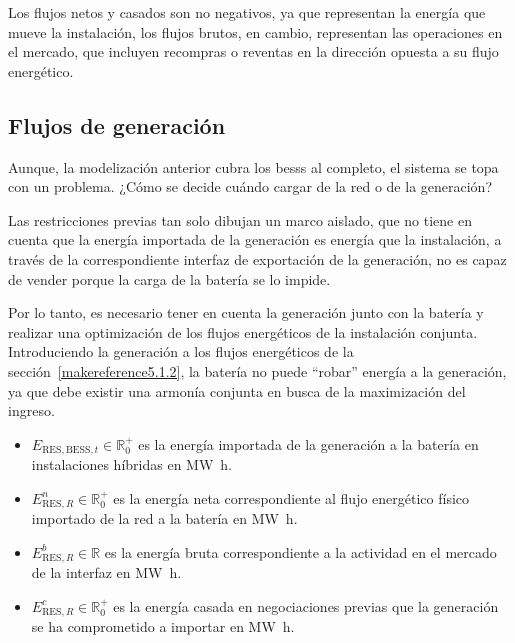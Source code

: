 Los flujos netos y casados son no negativos, ya que representan la energía que mueve la instalación, los flujos brutos, en cambio, representan las operaciones en el mercado, que incluyen recompras o reventas en la dirección opuesta a su flujo energético.

\subsection{Flujos de generación}
\label{makereference5.1.3}

Aunque, la modelización anterior cubra los \glspl{bess} al completo, el sistema se topa con un problema. ¿Cómo se decide cuándo cargar de la red o de la generación?

Las restricciones previas tan solo dibujan un marco aislado, que no tiene en cuenta que la energía importada de la generación es energía que la instalación, a través de la correspondiente interfaz de exportación de la generación, no es capaz de vender porque la carga de la batería se lo impide.

Por lo tanto, es necesario tener en cuenta la generación junto con la batería y realizar una optimización de los flujos energéticos de la instalación conjunta. Introduciendo la generación a los flujos energéticos de la sección~\ref{makereference5.1.2}, la batería no puede ``robar'' energía a la generación, ya que debe existir una armonía conjunta en busca de la maximización del ingreso.

\begin{itemize}

  \item \( E_{\text{RES}, \text{BESS}, t} \in \mathbb{R}^{+}_{0} \) es la energía importada de la generación a la batería en instalaciones híbridas en \si{{\mega\watt\hour}}.

  \item \( E^{n}_{\text{RES}, R} \in \mathbb{R}^{+}_{0} \) es la energía neta correspondiente al flujo energético físico importado de la red a la batería en \si{{\mega\watt\hour}}.

  \item \( E^{b}_{\text{RES}, R} \in \mathbb{R} \) es la energía bruta correspondiente a la actividad en el mercado de la interfaz en \si{{\mega\watt\hour}}.

  \item \( E^{c}_{\text{RES}, R} \in \mathbb{R}^{+}_{0} \) es la energía casada en negociaciones previas que la generación se ha comprometido a importar en \si{{\mega\watt\hour}}.

\end{itemize}

